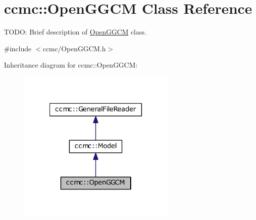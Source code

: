 \hypertarget{classccmc_1_1_open_g_g_c_m}{\section{ccmc\-:\-:Open\-G\-G\-C\-M Class Reference}
\label{classccmc_1_1_open_g_g_c_m}
}


T\-O\-D\-O\-: Brief description of \hyperlink{classccmc_1_1_open_g_g_c_m}{Open\-G\-G\-C\-M} class.  




{\ttfamily \#include $<$ccmc/\-Open\-G\-G\-C\-M.\-h$>$}



Inheritance diagram for ccmc\-:\-:Open\-G\-G\-C\-M\-:\nopagebreak
\begin{figure}[H]
\begin{center}
\leavevmode
\includegraphics[width=218pt]{classccmc_1_1_open_g_g_c_m__inherit__graph}
\end{center}
\end{figure}



